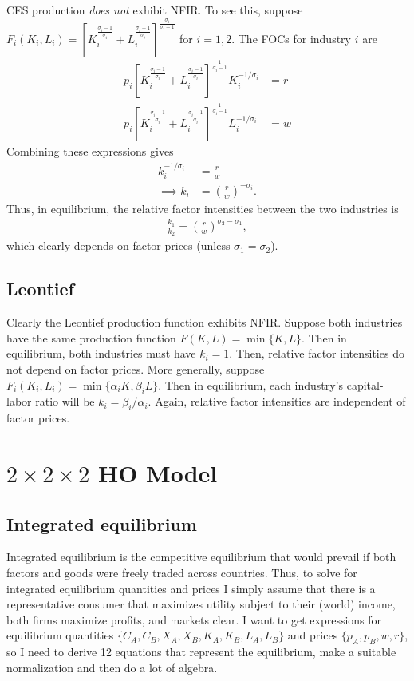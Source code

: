 \documentclass[12pt]{article}
\begin{document}
CES production \textit{does not} exhibit NFIR. To see this, suppose $F_i(K_i,L_i) = \left[K_i^{\frac{\sigma_i - 1}{\sigma_i}} + L_i^{\frac{\sigma_i - 1}{\sigma_i}}\right]^{\frac{\sigma_i}{\sigma_i - 1}}$ for $i = 1,2$. The FOCs for industry $i$ are
\begin{align}
p_i\left[K_i^{\frac{\sigma_i - 1}{\sigma_i}} + L_i^{\frac{\sigma_i - 1}{\sigma_i}}\right]^{\frac{1}{\sigma_i - 1}}K_i^{-1/\sigma_i} &= r \label{eq:ces1}\\
p_i\left[K_i^{\frac{\sigma_i - 1}{\sigma_i}} + L_i^{\frac{\sigma_i - 1}{\sigma_i}}\right]^{\frac{1}{\sigma_i - 1}}L_i^{-1/\sigma_i} &= w \label{eq:ces1}
\end{align}
Combining these expressions gives
\begin{align*}
k_i^{-1/\sigma_i} &= \frac{r}{w}\\
\implies k_i &= \left(\frac{r}{w}\right)^{-\sigma_i}.
\end{align*}
Thus, in equilibrium, the relative factor intensities between the two industries is
\begin{align*}
\frac{k_1}{k_2} = \left(\frac{r}{w}\right)^{\sigma_2-\sigma_1},
\end{align*}
which clearly depends on factor prices (unless $\sigma_1 = \sigma_2$).\\

\subsection{Leontief}

Clearly the Leontief production function exhibits NFIR. Suppose both industries have the same production function $F(K,L) = \min\{K,L\}$. Then in equilibrium, both industries must have $k_i = 1$. Then, relative factor intensities do not depend on factor prices. More generally, suppose $F_i(K_i,L_i) = \min\{\alpha_iK,\beta_iL\}$. Then in equilibrium, each industry's capital-labor ratio will be $k_i = \beta_i/\alpha_i$. Again, relative factor intensities are independent of factor prices.

\newpage

\section{$2 \times 2 \times 2$ HO Model}

\subsection{Integrated equilibrium}
Integrated equilibrium is the competitive equilibrium that would prevail if both factors and goods were freely traded across countries. Thus, to solve for integrated equilibrium quantities and prices I simply assume that there is a representative consumer that maximizes utility subject to their (world) income, both firms maximize profits, and markets clear. I want to get expressions for equilibrium quantities $\{C_A,C_B,X_A,X_B,K_A,K_B,L_A,L_B\}$ and prices $\{p_A,p_B,w,r\}$, so I need to derive 12 equations that represent the equilibrium, make a suitable normalization and then do a lot of algebra. \\
\end{document}
